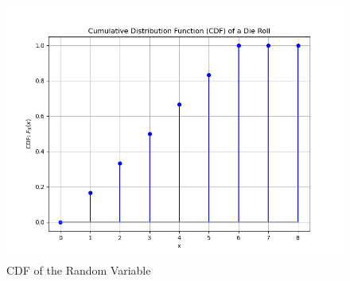 \documentclass[journal]{IEEEtran}
\numberwithin{equation}{enumi}
\numberwithin{figure}{enumi}
\begin{document}
\begin{figure}[H]
    \centering
    \includegraphics[width=\columnwidth]{figs/cdf_die.png}
    \caption{CDF of the Random Variable}
    \label{fig:enter-label}
\end{figure}
\end{document}
